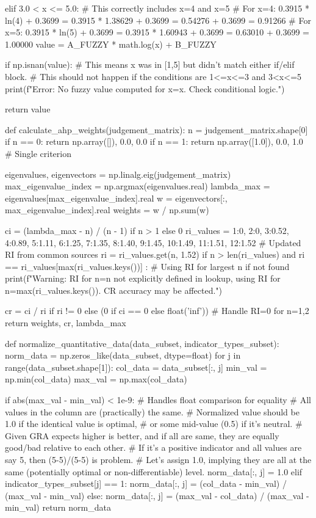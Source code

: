 \documentclass[12pt]{ctexart}
\begin{document}
\begin{python}
    elif 3.0 < x <= 5.0: # This correctly includes x=4 and x=5
        # For x=4: 0.3915 * ln(4) + 0.3699 = 0.3915 * 1.38629 + 0.3699 = 0.54276 + 0.3699 = 0.91266
        # For x=5: 0.3915 * ln(5) + 0.3699 = 0.3915 * 1.60943 + 0.3699 = 0.63010 + 0.3699 = 1.00000
        value = A_FUZZY * math.log(x) + B_FUZZY
    
    if np.isnan(value):
        # This means x was in [1,5] but didn't match either if/elif block.
        # This should not happen if the conditions are 1<=x<=3 and 3<x<=5
        print(f"Error: No fuzzy value computed for x={x}. Check conditional logic.")
        
    return value

def calculate_ahp_weights(judgement_matrix):
    n = judgement_matrix.shape[0]
    if n == 0: return np.array([]), 0.0, 0.0
    if n == 1: return np.array([1.0]), 0.0, 1.0 # Single criterion

    eigenvalues, eigenvectors = np.linalg.eig(judgement_matrix)
    max_eigenvalue_index = np.argmax(eigenvalues.real)
    lambda_max = eigenvalues[max_eigenvalue_index].real
    w = eigenvectors[:, max_eigenvalue_index].real
    weights = w / np.sum(w)
    
    ci = (lambda_max - n) / (n - 1) if n > 1 else 0
    ri_values = {1:0, 2:0, 3:0.52, 4:0.89, 5:1.11, 6:1.25, 7:1.35, 8:1.40, 9:1.45, 10:1.49, 11:1.51, 12:1.52} # Updated RI from common sources
    ri = ri_values.get(n, 1.52) 
    if n > len(ri_values) and ri == ri_values[max(ri_values.keys())] : # Using RI for largest n if not found
         print(f"Warning: RI for n={n} not explicitly defined in lookup, using RI for n={max(ri_values.keys())}. CR accuracy may be affected.")

    cr = ci / ri if ri != 0 else (0 if ci == 0 else float('inf')) # Handle RI=0 for n=1,2
    return weights, cr, lambda_max

def normalize_quantitative_data(data_subset, indicator_types_subset):
    norm_data = np.zeros_like(data_subset, dtype=float)
    for j in range(data_subset.shape[1]):
        col_data = data_subset[:, j]
        min_val = np.min(col_data)
        max_val = np.max(col_data)
        
        if abs(max_val - min_val) < 1e-9: # Handles float comparison for equality
            # All values in the column are (practically) the same.
            # Normalized value should be 1.0 if the identical value is optimal,
            # or some mid-value (0.5) if it's neutral.
            # Given GRA expects higher is better, and if all are same, they are equally good/bad relative to each other.
            # If it's a positive indicator and all values are say 5, then (5-5)/(5-5) is problem.
            # Let's assign 1.0, implying they are all at the same (potentially optimal or non-differentiable) level.
            norm_data[:, j] = 1.0 
        elif indicator_types_subset[j] == 1:
            norm_data[:, j] = (col_data - min_val) / (max_val - min_val)
        else:
            norm_data[:, j] = (max_val - col_data) / (max_val - min_val)
    return norm_data


\end{python}
\end{document}
